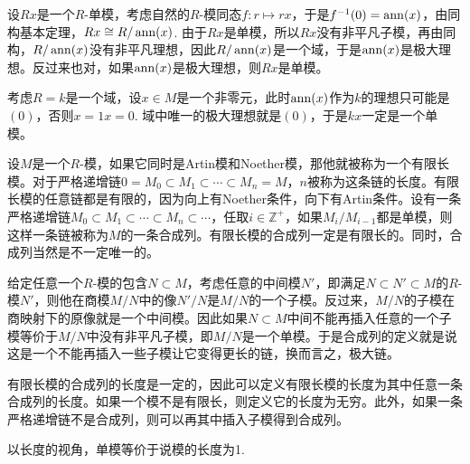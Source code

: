 设$Rx$是一个$R$-单模，考虑自然的$R$-模同态$f:r\mapsto rx$，于是$f^{-1}(0)=\operatorname{ann}(x)$，由同构基本定理，$Rx\cong R/\operatorname{ann}(x)$. 由于$Rx$是单模，所以$Rx$没有非平凡子模，再由同构，$R/\operatorname{ann}(x)$没有非平凡理想，因此$R/\operatorname{ann}(x)$是一个域，于是$\operatorname{ann}(x)$是极大理想。反过来也对，如果$\operatorname{ann}(x)$是极大理想，则$Rx$是单模。

考虑$R=k$是一个域，设$x\in M$是一个非零元，此时$\operatorname{ann}(x)$作为$k$的理想只可能是$(0)$，否则$x=1x=0$. 域中唯一的极大理想就是$(0)$，于是$kx$一定是一个单模。

\para 设$M$是一个$R$-模，如果它同时是Artin模和Noether模，那他就被称为一个有限长模。对于严格递增链$0=M_0\subset M_1\subset \cdots\subset M_n=M$，$n$被称为这条链的长度。有限长模的任意链都是有限的，因为向上有Noether条件，向下有Artin条件。设有一条严格递增链$M_0\subset M_1\subset \cdots\subset M_n \subset \cdots $，任取$i\in \mathbb{Z}^+$，如果$M_{i}/M_{i-1}$都是单模，则这样一条链被称为$M$的一条合成列。有限长模的合成列一定是有限长的。同时，合成列当然是不一定唯一的。

给定任意一个$R$-模的包含$N\subset M$，考虑任意的中间模$N'$，即满足$N\subset N'\subset M$的$R$-模$N'$，则他在商模$M/N$中的像$N'/N$是$M/N$的一个子模。反过来，$M/N$的子模在商映射下的原像就是一个中间模。因此如果$N\subset M$中间不能再插入任意的一个子模等价于$M/N$中没有非平凡子模，即$M/N$是一个单模。于是合成列的定义就是说这是一个不能再插入一些子模让它变得更长的链，换而言之，极大链。

\begin{pro}
有限长模的合成列的长度是一定的，因此可以定义有限长模的长度为其中任意一条合成列的长度。如果一个模不是有限长，则定义它的长度为无穷。此外，如果一条严格递增链不是合成列，则可以再其中插入子模得到合成列。
\end{pro}

以长度的视角，单模等价于说模的长度为1.

